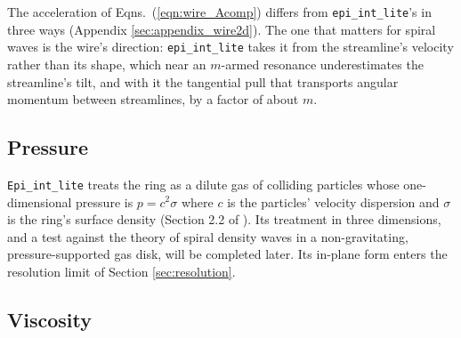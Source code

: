 \documentclass[twocolumn]{aastex702}
\newcommand{\code}[1]{\texttt{#1}}   %
\begin{document}
The acceleration of Eqns.\ (\ref{eqn:wire_Acomp}) differs from \code{epi\_int\_lite}'s in three ways
(Appendix \ref{sec:appendix_wire2d}). The one that matters for spiral waves is the wire's direction:
\code{epi\_int\_lite} takes it from the streamline's velocity rather than its shape, which near an $m$-armed resonance
underestimates the streamline's tilt, and with it the tangential pull that transports angular momentum between
streamlines, by a factor of about $m$.

\subsection{Pressure}
\label{sec:pressure}

\code{Epi\_int\_lite} treats the ring as a dilute gas of colliding particles whose one-dimensional
pressure is $p = c^2\sigma$ where $c$ is the particles' velocity dispersion and $\sigma$ is the ring's
surface density (Section 2.2 of \citealt{H25}). Its treatment in three dimensions, and a test against
the theory of spiral density waves in a non-gravitating, pressure-supported gas disk, will be
completed later. Its in-plane form enters the resolution limit of Section \ref{sec:resolution}.

\subsection{Viscosity}
\label{sec:viscosity}
\end{document}
